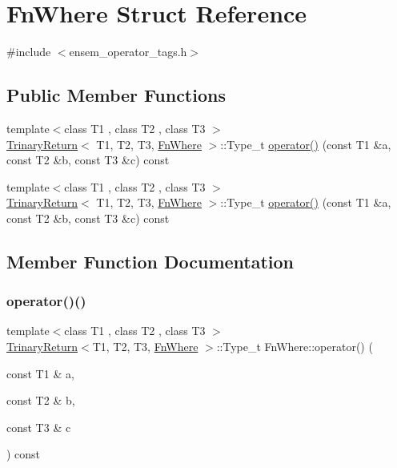 \hypertarget{structFnWhere}{}\section{Fn\+Where Struct Reference}
\label{structFnWhere}


{\ttfamily \#include $<$ensem\+\_\+operator\+\_\+tags.\+h$>$}

\subsection*{Public Member Functions}
\begin{DoxyCompactItemize}
\item 
{\footnotesize template$<$class T1 , class T2 , class T3 $>$ }\\\mbox{\hyperlink{structTrinaryReturn}{Trinary\+Return}}$<$ T1, T2, T3, \mbox{\hyperlink{structFnWhere}{Fn\+Where}} $>$\+::Type\+\_\+t \mbox{\hyperlink{structFnWhere_ad37f5c32c5ad4b8288a595841b16e178}{operator()}} (const T1 \&a, const T2 \&b, const T3 \&c) const
\item 
{\footnotesize template$<$class T1 , class T2 , class T3 $>$ }\\\mbox{\hyperlink{structTrinaryReturn}{Trinary\+Return}}$<$ T1, T2, T3, \mbox{\hyperlink{structFnWhere}{Fn\+Where}} $>$\+::Type\+\_\+t \mbox{\hyperlink{structFnWhere_ad37f5c32c5ad4b8288a595841b16e178}{operator()}} (const T1 \&a, const T2 \&b, const T3 \&c) const
\end{DoxyCompactItemize}


\subsection{Member Function Documentation}
\mbox{\label{structFnWhere_ad37f5c32c5ad4b8288a595841b16e178}} 
\subsubsection{\texorpdfstring{operator()()}{operator()()}\hspace{0.1cm}{\footnotesize\ttfamily [1/2]}}
{\footnotesize\ttfamily template$<$class T1 , class T2 , class T3 $>$ \\
\mbox{\hyperlink{structTrinaryReturn}{Trinary\+Return}}$<$T1, T2, T3, \mbox{\hyperlink{structFnWhere}{Fn\+Where}} $>$\+::Type\+\_\+t Fn\+Where\+::operator() (\begin{DoxyParamCaption}\item[{const T1 \&}]{a,  }\item[{const T2 \&}]{b,  }\item[{const T3 \&}]{c }\end{DoxyParamCaption}) const\hspace{0.3cm}{\ttfamily [inline]}}

